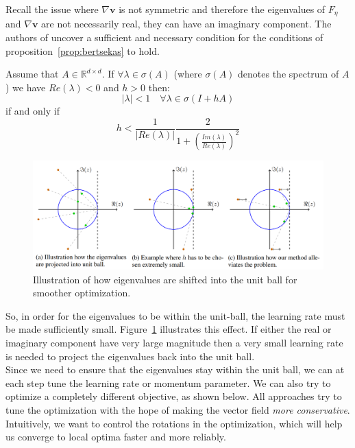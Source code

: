 \documentclass{article}
\renewcommand{\vec}[1]{\ensuremath{\boldsymbol{#1}}}
\begin{document}
Recall the issue where  $\nabla\vec{v}$ is not symmetric and therefore the eigenvalues of $F_\eta$ and $\nabla\vec{v}$ are not necessarily real, they can have an imaginary component. The authors of \cite{MeschederNG17a} uncover a sufficient and necessary condition for the conditions of proposition~\ref{prop:bertsekas} to hold.

\begin{lem} Assume that $A \in \mathbb{R}^{d\times d}$. If $\forall \lambda \in \sigma(A)$ (where $\sigma(A)$ denotes the spectrum of $A$) we have $Re(\lambda)<0$ and $h>0$ then:
\[
|\lambda| < 1 \quad \forall \lambda \in \sigma(I+hA)
\]
if and only if
\[
h < \frac{1}{|Re(\lambda)|} \frac{2}{1+(\frac{Im(\lambda)}{Re(\lambda)})^2}
\]
\end{lem}

\begin{figure}[h!]
    \centering
    \includegraphics[scale=0.45]{gans.PNG}
    \caption{Illustration of how eigenvalues are shifted into the unit ball for smoother optimization.}
    \label{fig:eval}
\end{figure}

So, in order for the eigenvalues to be within the unit-ball, the learning rate must be made sufficiently small. Figure~\ref{fig:eval} illustrates this effect. If either the real or imaginary component have very large magnitude then a very small learning rate is needed to project the eigenvalues back into the unit ball. 
\\

Since we need to ensure that the eigenvalues stay within the unit ball, we can at each step tune the learning rate or momentum parameter. We can also try to optimize a completely different objective, as shown below. All approaches try to tune the optimization with the hope of making the vector field \textit{more conservative}. Intuitively, we want to control the rotations in the optimization, which will help us converge to local optima faster and more reliably.
\\
\end{document}
